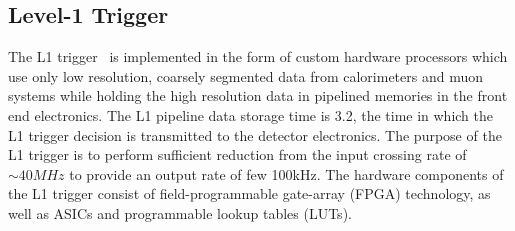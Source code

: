 \subsection{Level-1 Trigger}
The L1 trigger~\cite{triggerTDR} is implemented in the form of custom hardware processors which use only low resolution, coarsely segmented
data from calorimeters and muon systems while holding the high resolution data in pipelined memories in the front end electronics. The L1
pipeline data storage time is 3.2\unit{}, the time in which the L1 trigger decision is transmitted to the detector electronics. The
purpose of the L1 trigger is to perform sufficient reduction from the input crossing rate of $\sim40\unit{MHz}$ to provide an output rate of few 
100\unit{kHz}. The hardware components of the L1 trigger consist of field-programmable gate-array (FPGA) technology, as well as ASICs and programmable lookup tables (LUTs).

